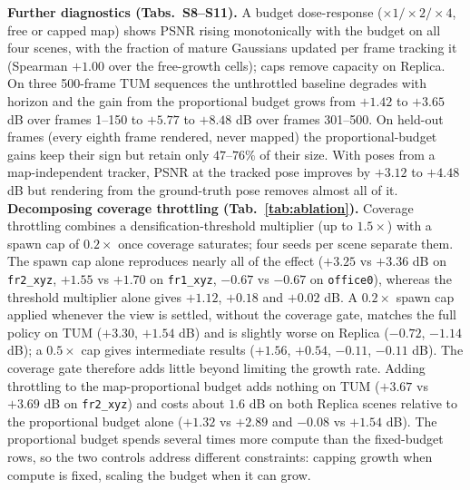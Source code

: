 \textbf{Further diagnostics (Tabs.~S8--S11).}
A budget dose-response ($\times1/\times2/\times4$, free or capped map) shows PSNR rising monotonically with the budget on all four scenes, with the fraction of mature Gaussians updated per frame tracking it (Spearman $+1.00$ over the free-growth cells); caps remove capacity on Replica. On three 500-frame TUM sequences the unthrottled baseline degrades with horizon and the gain from the proportional budget grows from $+1.42$ to $+3.65$ dB over frames 1--150 to $+5.77$ to $+8.48$ dB over frames 301--500. On held-out frames (every eighth frame rendered, never mapped) the proportional-budget gains keep their sign but retain only $47$--$76\%$ of their size. With poses from a map-independent tracker, PSNR at the tracked pose improves by $+3.12$ to $+4.48$ dB but rendering from the ground-truth pose removes almost all of it.
\textbf{Decomposing coverage throttling (Tab.~\ref{tab:ablation}).}
Coverage throttling combines a densification-threshold multiplier (up to $1.5\times$) with a spawn cap of $0.2\times$ once coverage saturates; four seeds per scene separate them. The spawn cap alone reproduces nearly all of the effect ($+3.25$ vs $+3.36$ dB on \texttt{fr2\_xyz}, $+1.55$ vs $+1.70$ on \texttt{fr1\_xyz}, $-0.67$ vs $-0.67$ on \texttt{office0}), whereas the threshold multiplier alone gives $+1.12$, $+0.18$ and $+0.02$ dB. A $0.2\times$ spawn cap applied whenever the view is settled, without the coverage gate, matches the full policy on TUM ($+3.30$, $+1.54$ dB) and is slightly worse on Replica ($-0.72$, $-1.14$ dB); a $0.5\times$ cap gives intermediate results ($+1.56$, $+0.54$, $-0.11$, $-0.11$ dB). The coverage gate therefore adds little beyond limiting the growth rate. Adding throttling to the map-proportional budget adds nothing on TUM ($+3.67$ vs $+3.69$ dB on \texttt{fr2\_xyz}) and costs about $1.6$ dB on both Replica scenes relative to the proportional budget alone ($+1.32$ vs $+2.89$ and $-0.08$ vs $+1.54$ dB). The proportional budget spends several times more compute than the fixed-budget rows, so the two controls address different constraints: capping growth when compute is fixed, scaling the budget when it can grow.



